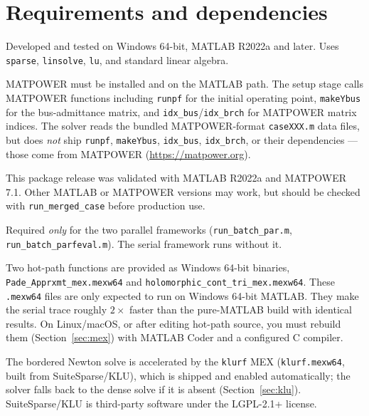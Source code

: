 \documentclass[11pt,a4paper]{article}
\newcommand{\code}[1]{\texttt{#1}}
\begin{document}
\section{Requirements and dependencies}

\begin{description}[leftmargin=0em,style=nextline]
\item[MATLAB (required).] Developed and tested on Windows 64-bit, MATLAB R2022a and
      later. Uses \code{sparse}, \code{linsolve}, \code{lu}, and standard linear algebra.
\item[MATPOWER (required).] MATPOWER must be installed and on the MATLAB path. The setup
      stage calls MATPOWER functions including \code{runpf} for the initial operating
      point, \code{makeYbus} for the bus-admittance matrix, and
      \code{idx_bus}/\code{idx_brch} for MATPOWER matrix indices. The solver reads the
      bundled MATPOWER-format \code{caseXXX.m} data files, but does \emph{not} ship
      \code{runpf}, \code{makeYbus}, \code{idx_bus}, \code{idx_brch}, or their
      dependencies --- those come from MATPOWER (\url{https://matpower.org}).
\item[Validated setup.] This package release was validated with MATLAB R2022a and
      MATPOWER 7.1. Other MATLAB or MATPOWER versions may work, but should be checked with
      \code{run_merged_case} before production use.
\item[Parallel Computing Toolbox (optional).] Required \emph{only} for the two parallel
      frameworks (\code{run_batch_par.m}, \code{run_batch_parfeval.m}). The serial
      framework runs without it.
\item[Compiled MEX (shipped).] Two hot-path functions are provided as Windows 64-bit
      binaries, \code{Pade_Apprxmt_mex.mexw64} and \code{holomorphic_cont_tri_mex.mexw64}.
      These \code{.mexw64} files are only expected to run on Windows 64-bit MATLAB. They
      make the serial trace roughly $2\times$ faster than the pure-MATLAB build with
      identical results. On Linux/macOS, or after editing hot-path source, you must
      rebuild them (Section~\ref{sec:mex}) with MATLAB Coder and a configured C compiler.
\item[KLU acceleration (shipped).] The bordered Newton solve is accelerated by the
      \code{klurf} MEX (\code{klurf.mexw64}, built from SuiteSparse/KLU), which is shipped and
      enabled automatically; the solver falls back to the dense solve if it is absent
      (Section~\ref{sec:klu}). SuiteSparse/KLU is third-party software under the LGPL-2.1+
      license.
\end{description}
\end{document}
